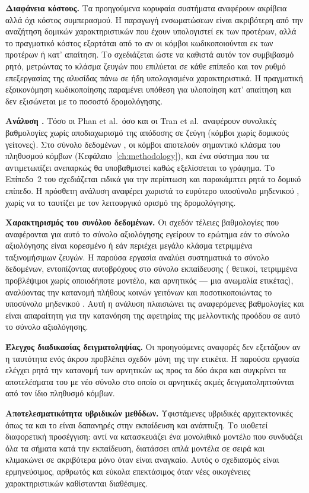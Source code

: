 \textbf{Διαφάνεια κόστους.} Τα προηγούμενα κορυφαία συστήματα αναφέρουν ακρίβεια
αλλά όχι κόστος συμπερασμού.
Η παραγωγή ενσωματώσεων  είναι ακριβότερη από την
αναζήτηση δομικών χαρακτηριστικών που έχουν υπολογιστεί εκ των προτέρων, αλλά το πραγματικό κόστος
εξαρτάται από το αν οι κόμβοι κωδικοποιούνται εκ των προτέρων ή κατ' απαίτηση.
Το  σχεδιάζεται ώστε να
καθιστά αυτόν τον συμβιβασμό ρητό, μετρώντας το κλάσμα ζευγών που επιλύεται σε κάθε
επίπεδο και τον ρυθμό επεξεργασίας της αλυσίδας πάνω σε ήδη υπολογισμένα
χαρακτηριστικά.
Η πραγματική εξοικονόμηση κωδικοποίησης παραμένει υπόθεση για
υλοποίηση κατ' απαίτηση και δεν εξισώνεται με το ποσοστό δρομολόγησης.

\textbf{Ανάλυση .} Τόσο οι Phan et al.\ όσο και οι Tran
et al.\ αναφέρουν συνολικές βαθμολογίες χωρίς αποδιαχωρισμό της απόδοσης σε ζεύγη
 (κόμβοι χωρίς δομικούς γείτονες).
Στο σύνολο δεδομένων
, οι κόμβοι  αποτελούν σημαντικό κλάσμα του
πληθυσμού κόμβων (Κεφάλαιο~\ref{ch:methodology}), και ένα σύστημα που τα
αντιμετωπίζει ανεπαρκώς θα υποβαθμιστεί καθώς εξελίσσεται το γράφημα.
Το Επίπεδο~2 του
 σχεδιάζεται ειδικά για την περίπτωση  και
παρακάμπτει ρητά το δομικό επίπεδο.
Η πρόσθετη ανάλυση αναφέρει χωριστά το
ευρύτερο υποσύνολο μηδενικού , χωρίς να το ταυτίζει με τον λειτουργικό
ορισμό της δρομολόγησης.

\textbf{Χαρακτηρισμός του συνόλου δεδομένων.} Οι σχεδόν τέλειες βαθμολογίες που
αναφέρονται για αυτό το σύνολο αξιολόγησης εγείρουν το ερώτημα εάν το σύνολο
αξιολόγησης είναι κορεσμένο ή εάν περιέχει μεγάλο κλάσμα τετριμμένα ταξινομήσιμων
ζευγών.
Η παρούσα εργασία αναλύει συστηματικά το σύνολο δεδομένων, εντοπίζοντας \SelfLoopsTrain{}
αυτοβρόχους στο σύνολο εκπαίδευσης (\SelfLoopsTrainPos{} θετικοί, τετριμμένα προβλέψιμοι χωρίς
οποιοδήποτε μοντέλο, και \SelfLoopsTrainNeg{} αρνητικός --- μια ανωμαλία ετικέτας), αναλύοντας
την κατανομή πλήθους κοινών γειτόνων και ποσοτικοποιώντας το υποσύνολο
μηδενικού .
Αυτή η ανάλυση πλαισιώνει τις αναφερόμενες βαθμολογίες και
είναι απαραίτητη για την κατανόηση της αφετηρίας της μελλοντικής προόδου σε αυτό το
σύνολο αξιολόγησης.

\textbf{Έλεγχος διαδικασίας δειγματοληψίας.} Οι προηγούμενες αναφορές δεν
εξετάζουν αν η ταυτότητα ενός άκρου προβλέπει σχεδόν μόνη της την ετικέτα.
Η
παρούσα εργασία ελέγχει ρητά την κατανομή των αρνητικών ως προς τα δύο άκρα και
συγκρίνει τα αποτελέσματα του  με νέο σύνολο στο οποίο οι αρνητικές
ακμές δειγματοληπτούνται από τον ίδιο πληθυσμό κόμβων.

\textbf{Αποτελεσματικότητα υβριδικών μεθόδων.} Υφιστάμενες υβριδικές αρχιτεκτονικές
όπως τα  και το  είναι δαπανηρές στην εκπαίδευση και
ανάπτυξη.
Το  υιοθετεί διαφορετική προσέγγιση: αντί να κατασκευάζει ένα
μονολιθικό μοντέλο που συνδυάζει όλα τα σήματα κατά την εκπαίδευση, διατάσσει απλά
μοντέλα σε σειρά και κλιμακώνει σε ακριβότερα μόνο όταν είναι αναγκαίο.
Αυτός ο
σχεδιασμός είναι ερμηνεύσιμος, αρθρωτός και εύκολα επεκτάσιμος όταν νέες οικογένειες
χαρακτηριστικών καθίστανται διαθέσιμες.
